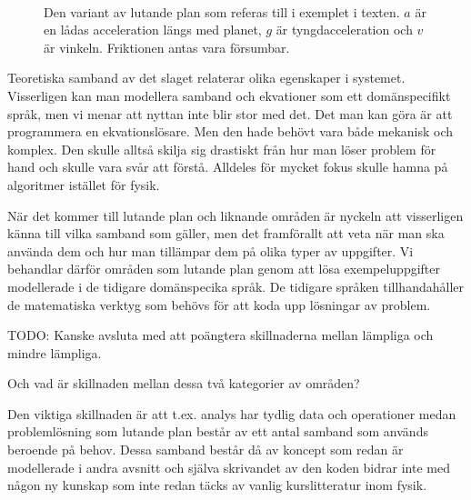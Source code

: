 \begin{binge}
\begin{figure}[tph]
  \caption{Den variant av lutande plan som referas till i exemplet i texten. $a$
  är en lådas acceleration längs med planet, $g$ är tyngdacceleration och $v$ är
  vinkeln. Friktionen antas vara försumbar.}~\label{fig:lutande_plan}
\end{figure}

Teoretiska samband av det slaget relaterar olika egenskaper i systemet.
Visserligen kan man modellera samband och ekvationer som ett domänspecifikt
språk, men vi menar att nyttan inte blir stor med det. Det man kan göra är att
programmera en ekvationslösare. Men den hade behövt vara både mekanisk och
komplex. Den skulle alltså skilja sig drastiskt från hur man löser problem för
hand och skulle vara svår att förstå. Alldeles för mycket fokus skulle hamna på
algoritmer istället för fysik.

När det kommer till lutande plan och liknande områden är nyckeln att visserligen
känna till vilka samband som gäller, men det framförallt att veta när man ska
använda dem och hur man tillämpar dem på olika typer av uppgifter. Vi behandlar
därför områden som lutande plan genom att lösa exempeluppgifter modellerade i de
tidigare domänspecika språk. De tidigare språken tillhandahåller de matematiska
verktyg som behövs för att koda upp lösningar av problem.


TODO: Kanske avsluta med att poängtera skillnaderna mellan lämpliga och mindre lämpliga.

Och vad är skillnaden mellan dessa två kategorier av områden?

Den viktiga skillnaden är att t.ex. analys har tydlig data och operationer 
medan problemlösning som lutande plan består av ett antal samband som används
beroende på behov. Dessa samband består då av koncept som redan är modellerade i
andra avsnitt och själva skrivandet av den koden bidrar inte med någon ny
kunskap som inte redan täcks av vanlig kurslitteratur inom fysik.


\end{binge}
